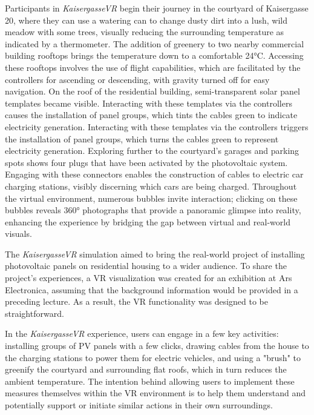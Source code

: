 \documentclass[draft, final]{vutinfth} %
\begin{document}
Participants in \textit{KaisergasseVR} begin their journey in the courtyard of Kaisergasse 20, where they can use a watering can to change dusty dirt into a lush, wild meadow with some trees, visually reducing the surrounding temperature as indicated by a thermometer. The addition of greenery to two nearby commercial building rooftops brings the temperature down to a comfortable 24°C. Accessing these rooftops involves the use of flight capabilities, which are facilitated by the controllers for ascending or descending, with gravity turned off for easy navigation. On the roof of the residential building, semi-transparent solar panel templates became visible. Interacting with these templates via the controllers causes the installation of panel groups, which tints the cables green to indicate electricity generation.
Interacting with these templates via the controllers triggers the installation of panel groups, which turns the cables green to represent electricity generation. Exploring further to the courtyard's garages and parking spots shows four plugs that have been activated by the photovoltaic system. Engaging with these connectors enables the construction of cables to electric car charging stations, visibly discerning which cars are being charged.
Throughout the virtual environment, numerous bubbles invite interaction; clicking on these bubbles reveals 360° photographs that provide a panoramic glimpse into reality, enhancing the experience by bridging the gap between virtual and real-world visuals.

The \textit{KaisergasseVR} simulation aimed to bring the real-world project of installing photovoltaic panels on residential housing to a wider audience. To share the project's experiences, a VR visualization was created for an exhibition at Ars Electronica, assuming that the background information would be provided in a preceding lecture. As a result, the VR functionality was designed to be straightforward.

In the \textit{KaisergasseVR} experience, users can engage in a few key activities: installing groups of PV panels with a few clicks, drawing cables from the house to the charging stations to power them for electric vehicles, and using a "brush" to greenify the courtyard and surrounding flat roofs, which in turn reduces the ambient temperature. The intention behind allowing users to implement these measures themselves within the VR environment is to help them understand and potentially support or initiate similar actions in their own surroundings.
\end{document}
